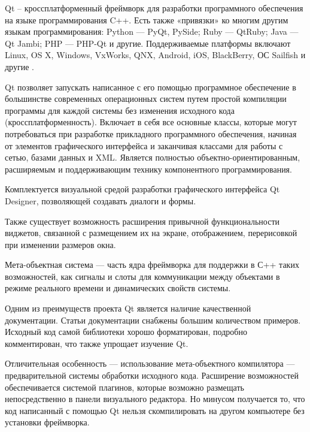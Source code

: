 Qt – кроссплатформенный фреймворк для разработки программного обеспечения на языке программирования C++. Есть также «привязки» ко многим другим языкам программирования: Python — PyQt, PySide; Ruby — QtRuby; Java — Qt Jambi; PHP — PHP-Qt и другие. Поддерживаемые платформы включают Linux, OS X, Windows, VxWorks, QNX, Android, iOS, BlackBerry, ОС Sailfish и другие \cite{Qt}.

Qt позволяет запускать написанное с его помощью программное обеспечение в большинстве современных операционных систем путем простой компиляции программы для каждой системы без изменения исходного кода (кроссплатформенность). Включает в себя все основные классы, которые могут потребоваться при разработке прикладного программного обеспечения, начиная от элементов графического интерфейса и заканчивая классами для работы с сетью, базами данных и XML. Является полностью объектно-ориентированным, расширяемым и поддерживающим технику компонентного программирования.

Комплектуется визуальной средой разработки графического интерфейса Qt Designer, позволяющей создавать диалоги и формы.

Также существует возможность расширения привычной функциональности виджетов, связанной с размещением их на экране, отображением, перерисовкой при изменении размеров окна.

Мета-объектная система — часть ядра фреймворка для поддержки в С++ таких возможностей, как сигналы и слоты для коммуникации между объектами в режиме реального времени и динамических свойств системы.

Одним из преимуществ проекта Qt является наличие качественной документации. Статьи документации снабжены большим количеством примеров. Исходный код самой библиотеки хорошо форматирован, подробно комментирован, что также упрощает изучение Qt.

Отличительная особенность — использование мета-объектного компилятора — предварительной системы обработки исходного кода. Расширение возможностей обеспечивается системой плагинов, которые возможно размещать непосредственно в панели визуального редактора. Но минусом получается то, что код написанный с помощью Qt нельзя скомпилировать на другом компьютере без установки фреймворка.


